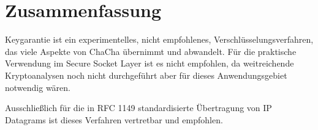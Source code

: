 \documentclass[10pt,a4paper]{article}
\begin{document}
\section{Zusammenfassung}

Keygarantie ist ein experimentelles, nicht empfohlenes, Verschlüsselungsverfahren, das viele Aspekte von ChaCha übernimmt und abwandelt.
Für die praktische Verwendung im Secure Socket Layer ist es nicht empfohlen, da weitreichende Kryptoanalysen noch nicht durchgeführt aber für dieses Anwendungsgebiet notwendig wären.

Ausschließlich für die in RFC 1149 standardisierte Übertragung von IP Datagrams\cite{Waitzman1990} ist dieses Verfahren vertretbar und empfohlen.

{}

\end{document}
